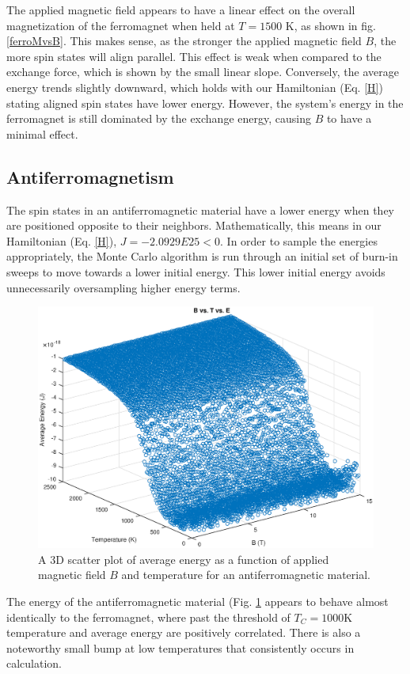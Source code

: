 \documentclass[12pt]{article}
\begin{document}
The applied magnetic field appears to have a linear effect on the overall magnetization of the ferromagnet when held at $T=1500$ K, as shown in fig. \ref{ferroMvsB}.  This makes sense, as the stronger the applied magnetic field $B$, the more spin states will align parallel.  This effect is weak when compared to the exchange force, which is shown by the small linear slope.  Conversely, the average energy trends slightly downward, which holds with our Hamiltonian (Eq. \ref{H}) stating aligned spin states have lower energy.  However, the system's energy in the ferromagnet is still dominated by the exchange energy, causing $B$ to have a minimal effect.

\subsection*{Antiferromagnetism}
The spin states in an antiferromagnetic material have a lower energy when they are positioned opposite to their neighbors.  Mathematically, this means in our Hamiltonian (Eq. \ref{H}), $J = -2.0929E25 < 0.$ \cite{magnettypes} In order to sample the energies appropriately, the Monte Carlo algorithm is run through an initial set of burn-in sweeps to move towards a lower initial energy.  This lower initial energy avoids unnecessarily oversampling higher energy terms.

\begin{figure}[!h]
\includegraphics[width=\linewidth]{./Antiferrographs/antiferroEsurf.eps}
\caption{A 3D scatter plot of average energy as a function of applied magnetic field $B$ and temperature for an antiferromagnetic material.}
\label{antiferroEsurf}
\end{figure}
The energy of the antiferromagnetic material (Fig. \ref{antiferroEsurf} appears to behave almost identically to the ferromagnet, where past the threshold of $T_C=1000$K temperature and average energy are positively correlated.  There is also a noteworthy small bump at low temperatures that consistently occurs in calculation. 
\end{document}
